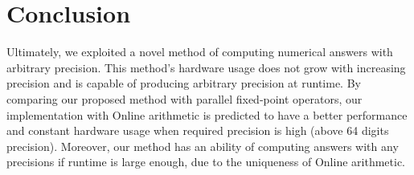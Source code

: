 \documentclass{sig-alternate}
\begin{document}
\section{Conclusion}
Ultimately, we exploited a novel method of computing numerical answers with arbitrary precision. This method's hardware usage does not grow with increasing precision and is capable of producing arbitrary precision at runtime. By comparing our proposed method with parallel fixed-point operators, our implementation with Online arithmetic is predicted to have a better performance and constant hardware usage when required precision is high (above 64 digits precision). Moreover, our method has an ability of computing answers with any precisions if runtime is large enough, due to the uniqueness of Online arithmetic.  


	 
	
	
\end{document}
